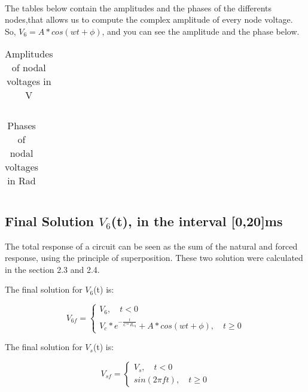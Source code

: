 \paragraph{}
\par The tables below contain the amplitudes and the phases of the differents nodes,that allows us to compute the complex amplitude of every node voltage. So, $V_{6} = A*cos(wt + \phi)$, and you can see the amplitude and the phase below.

\begin{table}[!h]
\centering
\begin{tabularx}{0.6\textwidth} {
  | >{\raggedright\arraybackslash}X
  | >{\raggedleft\arraybackslash}X | }
 \hline

\end{tabularx}
\caption{Amplitudes of nodal voltages in V}
\end{table}

\begin{table}[!h]
\centering
\begin{tabularx}{0.6\textwidth} {
  | >{\raggedright\arraybackslash}X
  | >{\raggedleft\arraybackslash}X | }
 \hline

\end{tabularx}
\caption{Phases of nodal voltages in Rad}
\end{table}

\newpage

\subsection{Final Solution $V_{6}$(t), in the interval [0,20]ms}


\par The total response of a circuit can be seen as the sum of the natural and forced response, using the principle of superposition. These two solution were calculated in the section 2.3 and 2.4.

The final solution for $V_6$(t) is: 

\begin{equation}
    V_{6f} = \begin{cases} V_6, \quad t<0 \\ V_{c}*e^{-\frac{t}{C*R_{eq}}} + A*cos(wt + \phi), \quad t \geq 0  \end{cases}
\end{equation}


The final solution for $V_s$(t) is:

\begin{equation}
    V_{sf} = \begin{cases} V_s, \quad t<0 \\ sin(2 \pi ft), \quad t \geq 0 \end{cases}
\end{equation}

